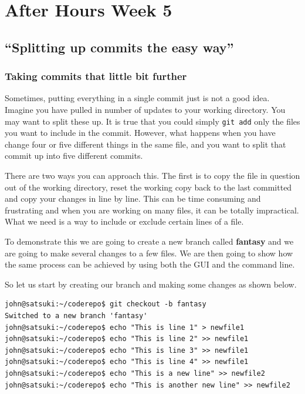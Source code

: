 \chapter{After Hours Week 5}
\section{``Splitting up commits the easy way''}
\subsection{Taking commits that little bit further}

Sometimes, putting everything in a single commit just is not a good idea.
Imagine you have pulled in number of updates to your working directory.
You may want to split these up.
It is true that you could simply \texttt{git add} only the files you want to include in the commit.
However, what happens when you have change four or five different things in the same file, and you want to split that commit up into five different commits.

There are two ways you can approach this.
The first is to copy the file in question out of the working directory, reset the working copy back to the last committed and copy your changes in line by line.
This can be time consuming and frustrating and when you are working on many files, it can be totally impractical.
What we need is a way to include or exclude certain lines of a file.

To demonstrate this we are going to create a new branch called \textbf{fantasy} and we are going to make several changes to a few files.
We are then going to show how the same process can be achieved by using both the GUI and the command line.

So let us start by creating our branch and making some changes as shown below.

\begin{Verbatim}
john@satsuki:~/coderepo$ git checkout -b fantasy
Switched to a new branch 'fantasy'
john@satsuki:~/coderepo$ echo "This is line 1" > newfile1
john@satsuki:~/coderepo$ echo "This is line 2" >> newfile1
john@satsuki:~/coderepo$ echo "This is line 3" >> newfile1
john@satsuki:~/coderepo$ echo "This is line 4" >> newfile1
john@satsuki:~/coderepo$ echo "This is a new line" >> newfile2
john@satsuki:~/coderepo$ echo "This is another new line" >> newfile2
\end{Verbatim}

